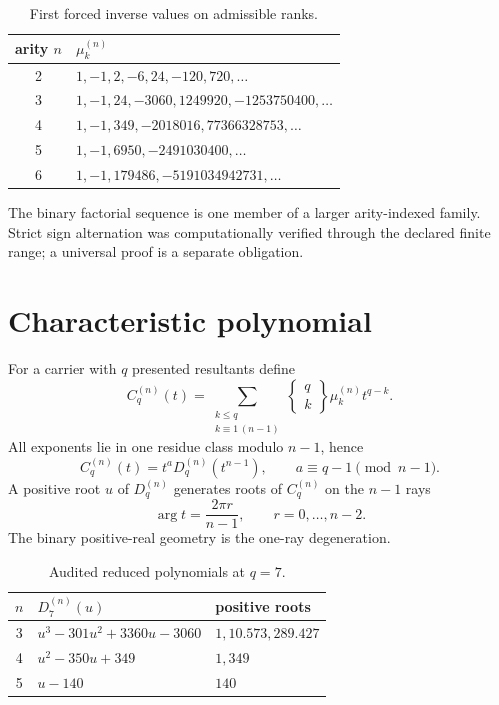 \documentclass[11pt,a4paper]{article}
\begin{document}
\begin{table}[H]\centering
\caption{First forced inverse values on admissible ranks.}
\begin{tabular}{cl}
\toprule
arity $n$ & $\mu_k^{(n)}$\\\midrule
2 & $1,-1,2,-6,24,-120,720,\ldots$\\
3 & $1,-1,24,-3060,1249920,-1253750400,\ldots$\\
4 & $1,-1,349,-2018016,77366328753,\ldots$\\
5 & $1,-1,6950,-2491030400,\ldots$\\
6 & $1,-1,179486,-5191034942731,\ldots$\\
\bottomrule
\end{tabular}
\end{table}
The binary factorial sequence is one member of a larger arity-indexed family. Strict sign alternation was computationally verified through the declared finite range; a universal proof is a separate obligation.

\section{Characteristic polynomial}
For a carrier with $q$ presented resultants define
\begin{equation}
C_q^{(n)}(t)=
\sum_{\substack{k\le q\\k\equiv1\,(n-1)}}
\left\{\begin{matrix}q\\k\end{matrix}\right\}\mu_k^{(n)}t^{q-k}.
\end{equation}
All exponents lie in one residue class modulo $n-1$, hence
\begin{equation}
\boxed{C_q^{(n)}(t)=t^aD_q^{(n)}(t^{n-1}),\qquad a\equiv q-1\pmod{n-1}.}
\end{equation}
A positive root $u$ of $D_q^{(n)}$ generates roots of $C_q^{(n)}$ on the $n-1$ rays
\begin{equation}
\arg t=\frac{2\pi r}{n-1},\qquad r=0,\ldots,n-2.
\end{equation}
The binary positive-real geometry is the one-ray degeneration.

\begin{table}[H]\centering
\caption{Audited reduced polynomials at $q=7$.}
\begin{tabular}{cll}
\toprule
$n$ & $D_7^{(n)}(u)$ & positive roots\\\midrule
3 & $u^3-301u^2+3360u-3060$ & $1,10.573,289.427$\\
4 & $u^2-350u+349$ & $1,349$\\
5 & $u-140$ & $140$\\
\bottomrule
\end{tabular}
\end{table}
\end{document}
